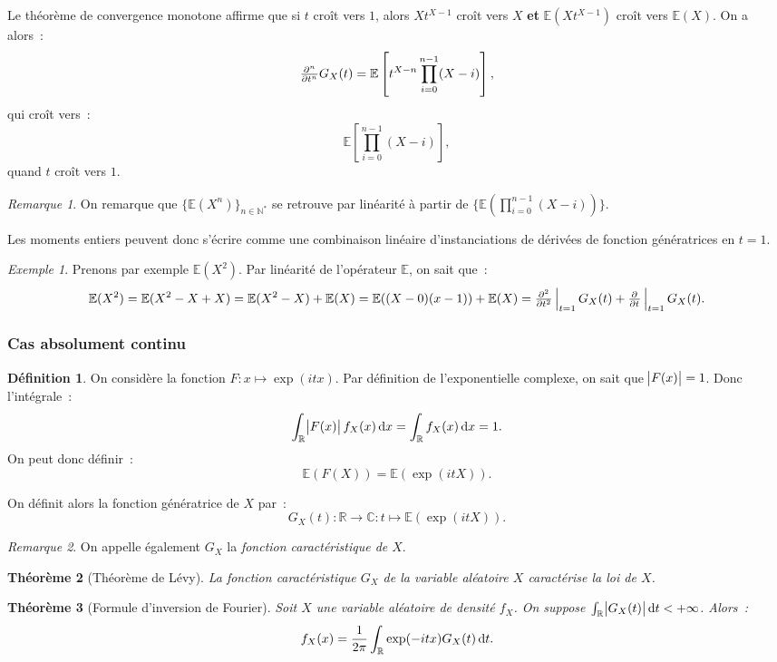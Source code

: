\documentclass{article}
\newcommand{\C}{\mathbb C}
\newcommand{\E}{\mathbb E}
\newcommand{\N}{\mathbb N}
\newcommand{\R}{\mathbb R}
\newcommand{\evpd}[2]{\pd {}{#1}\sVert[2]_{#1=#2}}  %
\newcommand{\evipd}[3][i]{\pd[#1] {}{#2}\sVert[2]_{#2=#3}}  %
\newtheorem{thm}{Théorème}[section]
\theoremstyle{definition}
\newtheorem{déf}[thm]{Définition}
\theoremstyle{remark}
\newtheorem*{rmq}{Remarque}
\newtheorem{ex}{Exemple}
\begin{document}
		Le théorème de convergence monotone affirme que si $t$ croît vers $1$, alors $Xt^{X-1}$ croît vers $X$ \textbf{et} $\E(Xt^{X-1})$ croît vers $\E(X)$.
		On a alors~:
		\[\pd[n] {}tG_X(t) = \E\left[t^{X-n}\prod_{i=0}^{n-1}(X-i)\right],\]
		qui croît vers~:
		\[\E\left[\prod_{i=0}^{n-1}(X-i)\right],\]
		quand $t$ croît vers $1$.

		\begin{rmq} On remarque que $\{\E(X^n)\}_{n \in \N^*}$ se retrouve par linéarité à partir de $\{\E\left(\prod_{i=0}^{n-1}(X-i)\right)\}$.

		Les moments entiers peuvent donc s'écrire comme une combinaison linéaire d'instanciations de dérivées de fonction génératrices en $t=1$. \end{rmq}

		\begin{ex} Prenons par exemple $\E(X^2)$. Par linéarité de l'opérateur $\E$, on sait que~:
		\[\E(X^2) = \E(X^2 - X + X) = \E(X^2-X) + \E(X) = \E((X-0)(x-1)) + \E(X) = \evipd[2] t1G_X(t) + \evpd t1G_X(t).\]
		\end{ex}

		\subsubsection{Cas absolument continu}
		\begin{déf} On considère la fonction $F : x \mapsto \exp(itx)$. Par définition de l'exponentielle complexe, on sait que $\abs {F(x)} = 1$.
		Donc l'intégrale~:
		\[\int_\R \abs{F(x)}f_X(x)\dif x = \int_\R f_X(x)\dif x = 1.\]
		On peut donc définir~:
		\[\E(F(X)) = \E(\exp(itX)).\]

		On définit alors la fonction génératrice de $X$ par~:
		\[G_X(t) : \R \to \C : t \mapsto \E(\exp(itX)).\]
		\end{déf}

		\begin{rmq} On appelle également $G_X$ la \emph{fonction caractéristique de $X$}. \end{rmq}

		\begin{thm}[Théorème de Lévy] La fonction caractéristique $G_X$ de la variable aléatoire $X$ caractérise la loi de $X$. \end{thm}

		\begin{thm}[Formule d'inversion de Fourier] Soit $X$ une variable aléatoire de densité $f_X$. On suppose $\int_\R \abs {G_X(t)}\dif t < +\infty$. Alors~:
		\[f_X(x) = \frac 1{2\pi}\int_\R\exp(-itx)G_X(t)\dif t.\]
		\end{thm}
\end{document}
